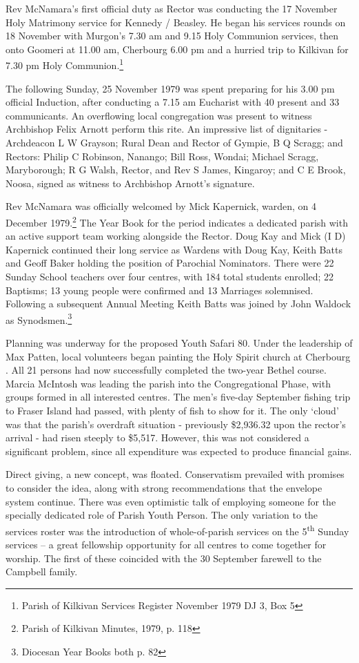 Rev McNamara's first official duty as Rector was conducting the 17 November Holy Matrimony service for Kennedy / Beasley. He began his services rounds on 18 November with Murgon's 7.30 am and 9.15 Holy Communion services, then onto Goomeri at 11.00 am, Cherbourg 6.00 pm and a hurried trip to Kilkivan for 7.30 pm Holy Communion.\footnote{Parish of Kilkivan Services Register November 1979 DJ 3, Box 5}

The following Sunday, 25 November 1979 was spent preparing for his 3.00 pm official Induction, after conducting a 7.15 am Eucharist with 40 present and 33 communicants. An overflowing local congregation was present to witness Archbishop Felix Arnott perform this rite. An impressive list of dignitaries - Archdeacon L W Grayson; Rural Dean and Rector of Gympie, B Q Scragg; and Rectors: Philip C Robinson, Nanango; Bill Ross, Wondai; Michael Scragg, Maryborough; R G Walsh, Rector, and Rev S James, Kingaroy; and C E Brook, Noosa, signed as witness to Archbishop Arnott's signature.

Rev McNamara was officially welcomed by Mick Kapernick, warden, on 4 December 1979.\footnote{Parish of Kilkivan Minutes, 1979, p. 118} The Year Book for the period indicates a dedicated parish with an active support team working alongside the Rector. Doug Kay and Mick (I D) Kapernick continued their long service as Wardens with Doug Kay, Keith Batts and Geoff Baker holding the position of Parochial Nominators. There were 22 Sunday School teachers over four centres, with 184 total students enrolled; 22 Baptisms; 13 young people were confirmed and 13 Marriages solemnised. Following a subsequent Annual Meeting Keith Batts was joined by John Waldock as Synodsmen.\footnote{Diocesan Year Books both p. 82}

Planning was underway for the proposed Youth Safari 80. Under the leadership of Max Patten, local volunteers began painting the Holy Spirit church at Cherbourg . All 21 persons had now successfully completed the two-year Bethel course. Marcia McIntosh was leading the parish into the Congregational Phase, with groups formed in all interested centres. The men's five-day September fishing trip to Fraser Island had passed, with plenty of fish to show for it. The only `cloud' was that the parish's overdraft situation - previously \$2,936.32 upon the rector's arrival - had risen steeply to \$5,517. However, this was not considered a significant problem, since all expenditure was expected to produce financial gains.

Direct giving, a new concept, was floated. Conservatism prevailed with promises to consider the idea, along with strong recommendations that the envelope system continue. There was even optimistic talk of employing someone for the specially dedicated role of Parish Youth Person. The only variation to the services roster was the introduction of whole-of-parish services on the 5\textsuperscript{th} Sunday services -- a great fellowship opportunity for all centres to come together for worship. The first of these coincided with the 30 September farewell to the Campbell family.

